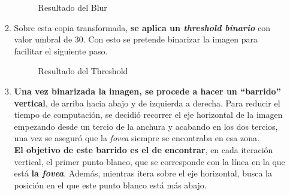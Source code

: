 \begin{enumerate}
\begin{enumerate}[label*=\arabic*.]
    \begin{figure}[H]
      \caption{Resultado del Blur}
      \centering \setlength\fboxsep{0pt} \setlength\fboxrule{0.5pt}
    \end{figure}

  \item Sobre esta copia transformada, \textbf{se aplica un
      \emph{threshold binario}} con valor umbral de $30$. Con esto se
    pretende binarizar la imagen para facilitar el siguiente paso.

    \begin{figure}[H]
      \caption{Resultado del Threshold}
      \centering \setlength\fboxsep{0pt} \setlength\fboxrule{0.5pt}
    \end{figure}

  \item \textbf{Una vez binarizada la imagen, se procede a hacer un
      ``barrido'' vertical}, de arriba hacia abajo y de izquierda a
    derecha. Para reducir el tiempo de computación, se decidió
    recorrer el eje horizontal de la imagen empezando desde un tercio
    de la anchura y acabando en los dos tercios, una vez se aseguró
    que la \emph{\gls{fovea}} siempre se encontraba en esa zona. \\
    \textbf{ El objetivo de este barrido es el de encontrar}, en cada
    iteración vertical, el primer punto blanco, que se corresponde con
    la línea en la que está \textbf{la \emph{\gls{fovea}}}. Además,
    mientras itera sobre el eje horizontal, busca la posición en el
    que este punto blanco está más abajo.


\end{enumerate}
\end{enumerate}
